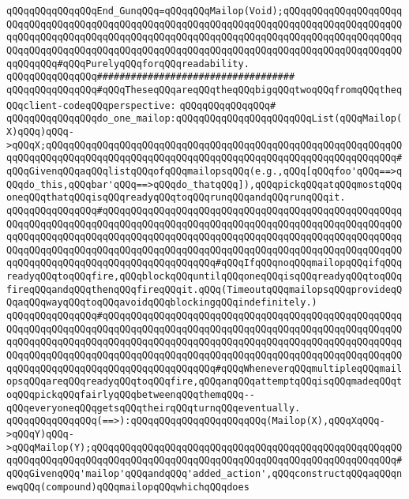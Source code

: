 \verb|qQQqqQQqqQQqqQQqEnd_GunqQQq=qQQqqQQqMailop(Void);qQQqqQQqqQQqqQQqqQQqqQQqqQQqqQQqqQQqqQQqqQQqqQQqqQQqqQQqqQQqqQQqqQQqqQQqqQQqqQQqqQQqqQQqqQQqqQQqqQQqqQQqqQQqqQQqqQQqqQQqqQQqqQQqqQQqqQQqqQQqqQQqqQQqqQQqqQQqqQQqqQQqqQQqqQQqqQQqqQQqqQQqqQQqqQQqqQQqqQQqqQQqqQQqqQQqqQQqqQQqqQQqqQQqqQQqqQQqqQQq#qQQqPurelyqQQqforqQQqreadability.|\newline
\newline
\newline
\verb|qQQqqQQqqQQqqQQq###################################|\newline
\verb|qQQqqQQqqQQqqQQq#qQQqTheseqQQqareqQQqtheqQQqbigqQQqtwoqQQqfromqQQqtheqQQqclient-codeqQQqperspective:|\newline
\verb|qQQqqQQqqQQqqQQq#|\newline
\verb|qQQqqQQqqQQqqQQqdo_one_mailop:qQQqqQQqqQQqqQQqqQQqqQQqList(qQQqMailop(X)qQQq)qQQq->qQQqX;qQQqqQQqqQQqqQQqqQQqqQQqqQQqqQQqqQQqqQQqqQQqqQQqqQQqqQQqqQQqqQQqqQQqqQQqqQQqqQQqqQQqqQQqqQQqqQQqqQQqqQQqqQQqqQQqqQQqqQQqqQQqqQQqqQQq#qQQqGivenqQQqaqQQqlistqQQqofqQQqmailopsqQQq(e.g.,qQQq[qQQqfoo'qQQq==>qQQqdo_this,qQQqbar'qQQq==>qQQqdo_thatqQQq]),qQQqpickqQQqatqQQqmostqQQqoneqQQqthatqQQqisqQQqreadyqQQqtoqQQqrunqQQqandqQQqrunqQQqit.|\newline
\verb|qQQqqQQqqQQqqQQq#qQQqqQQqqQQqqQQqqQQqqQQqqQQqqQQqqQQqqQQqqQQqqQQqqQQqqQQqqQQqqQQqqQQqqQQqqQQqqQQqqQQqqQQqqQQqqQQqqQQqqQQqqQQqqQQqqQQqqQQqqQQqqQQqqQQqqQQqqQQqqQQqqQQqqQQqqQQqqQQqqQQqqQQqqQQqqQQqqQQqqQQqqQQqqQQqqQQqqQQqqQQqqQQqqQQqqQQqqQQqqQQqqQQqqQQqqQQqqQQqqQQqqQQqqQQqqQQqqQQqqQQqqQQqqQQqqQQqqQQqqQQqqQQqqQQqqQQqqQQq#qQQqIfqQQqnoqQQqmailopqQQqifqQQqreadyqQQqtoqQQqfire,qQQqblockqQQquntilqQQqoneqQQqisqQQqreadyqQQqtoqQQqfireqQQqandqQQqthenqQQqfireqQQqit.qQQq(TimeoutqQQqmailopsqQQqprovideqQQqaqQQqwayqQQqtoqQQqavoidqQQqblockingqQQqindefinitely.)|\newline
\verb|qQQqqQQqqQQqqQQq#qQQqqQQqqQQqqQQqqQQqqQQqqQQqqQQqqQQqqQQqqQQqqQQqqQQqqQQqqQQqqQQqqQQqqQQqqQQqqQQqqQQqqQQqqQQqqQQqqQQqqQQqqQQqqQQqqQQqqQQqqQQqqQQqqQQqqQQqqQQqqQQqqQQqqQQqqQQqqQQqqQQqqQQqqQQqqQQqqQQqqQQqqQQqqQQqqQQqqQQqqQQqqQQqqQQqqQQqqQQqqQQqqQQqqQQqqQQqqQQqqQQqqQQqqQQqqQQqqQQqqQQqqQQqqQQqqQQqqQQqqQQqqQQqqQQqqQQqqQQq#qQQqWheneverqQQqmultipleqQQqmailopsqQQqareqQQqreadyqQQqtoqQQqfire,qQQqanqQQqattemptqQQqisqQQqmadeqQQqtoqQQqpickqQQqfairlyqQQqbetweenqQQqthemqQQq--qQQqeveryoneqQQqgetsqQQqtheirqQQqturnqQQqeventually.|\newline
\newline
\verb|qQQqqQQqqQQqqQQq(==>):qQQqqQQqqQQqqQQqqQQqqQQq(Mailop(X),qQQqXqQQq->qQQqY)qQQq->qQQqMailop(Y);qQQqqQQqqQQqqQQqqQQqqQQqqQQqqQQqqQQqqQQqqQQqqQQqqQQqqQQqqQQqqQQqqQQqqQQqqQQqqQQqqQQqqQQqqQQqqQQqqQQqqQQqqQQqqQQqqQQqqQQqqQQq#qQQqGivenqQQq'mailop'qQQqandqQQq'added_action',qQQqconstructqQQqaqQQqnewqQQq(compound)qQQqmailopqQQqwhichqQQqdoes|\newline
